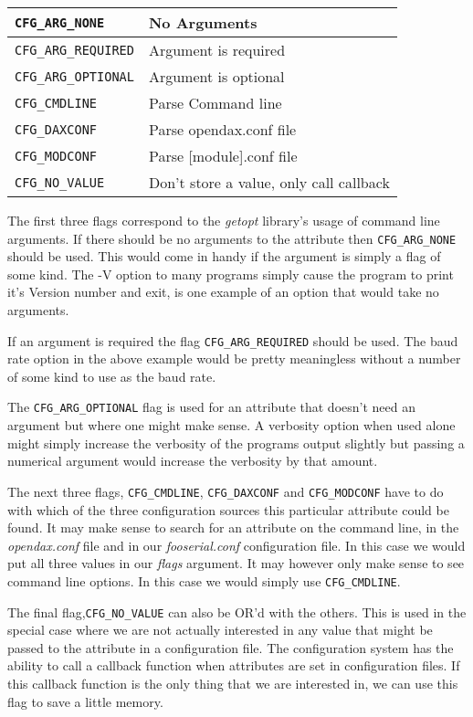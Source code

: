 \begin{tabular}{|l|l|}
\hline \verb|CFG_ARG_NONE| & No Arguments \\
\hline \verb|CFG_ARG_REQUIRED| & Argument is required \\
\hline \verb|CFG_ARG_OPTIONAL| & Argument is optional \\
\hline \verb|CFG_CMDLINE| & Parse Command line \\
\hline \verb|CFG_DAXCONF| & Parse opendax.conf file \\
\hline \verb|CFG_MODCONF| & Parse [module].conf file \\
\hline \verb|CFG_NO_VALUE| & Don't store a value, only call callback \\
\hline
\end{tabular}

The first three flags correspond to the \textit{getopt} library's usage of
command line arguments.  If there should be no arguments to the attribute then
\verb|CFG_ARG_NONE| should be used.  This would come in handy if the argument is
simply a flag of some kind.  The -V option to many programs simply cause the
program to print it's Version number and exit, is one example of an option that
would take no arguments.

If an argument is required the flag \verb|CFG_ARG_REQUIRED| should be used.  The
baud rate option in the above example would be pretty meaningless without a
number of some kind to use as the baud rate.

The \verb|CFG_ARG_OPTIONAL| flag is used for an attribute that doesn't need an
argument but where one might make sense.  A verbosity option when used alone
might simply increase the verbosity of the programs output slightly but passing
a numerical argument would increase the verbosity by that amount.

The next three flags, \verb|CFG_CMDLINE|, \verb|CFG_DAXCONF| and
\verb|CFG_MODCONF| have to do with which of the three configuration sources this
particular attribute could be found.  It may make sense to search for an
attribute on the command line, in the \textit{opendax.conf} file and in our
\textit{fooserial.conf} configuration file.  In this case we would put all three
values in our \textit{flags} argument.  It may however only make sense to see
command line options.  In this case we would simply use \verb|CFG_CMDLINE|.

The final flag,\verb|CFG_NO_VALUE| can also be OR'd with the others.  This is
used in the special case where we are not actually interested in any value that
might be passed to the attribute in a configuration file.  The configuration
system has the ability to call a callback function when attributes are set in
configuration files.  If this callback function is the only thing that we are
interested in, we can use this flag to save a little memory.

